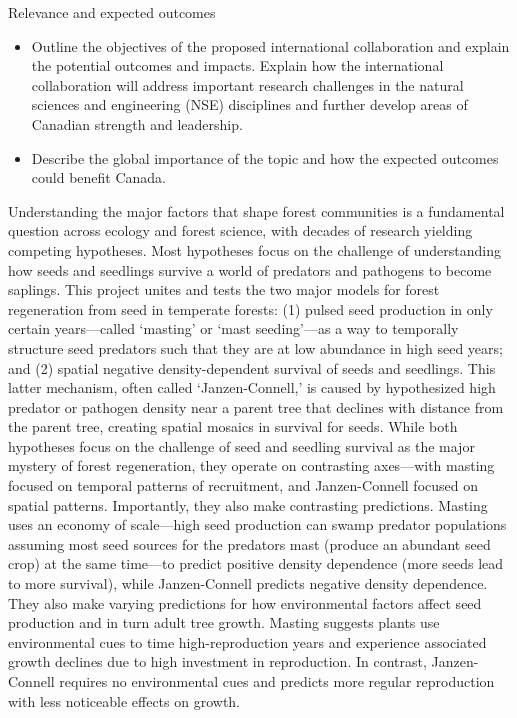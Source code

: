 \documentclass[12pt,oneside]{article}
\newenvironment{smitemize}{
\begin{itemize}
  \setlength{\itemsep}{1pt}
  \setlength{\parskip}{0pt}
  \setlength{\parsep}{0pt}}
{\end{itemize}
}
\begin{document}
{\sc Relevance and expected outcomes} 
\vspace{-1ex}
\begin{smitemize}
\item Outline the objectives of the proposed international collaboration and explain the potential outcomes and impacts. Explain how the international collaboration will address important research challenges in the natural sciences and engineering (NSE) disciplines and further develop areas of Canadian strength and leadership. 
\item Describe the global importance of the topic and how the expected outcomes could benefit Canada.
\end{smitemize}
Understanding the major factors that shape forest communities is a fundamental question across ecology and forest science, with decades of research yielding competing hypotheses. Most hypotheses focus on the challenge of understanding how seeds and seedlings survive a world of predators and pathogens to become saplings.\cite{janzen1971seed,connell1983prevalence,comita2014testing,davies2024seed} This project unites and tests the two major models for forest regeneration from seed in temperate forests: (1) pulsed seed production in only certain years---called `masting' or `mast seeding'---as a way to temporally structure seed predators such that they are at low abundance in high seed years;\cite{koenig2021brief,pearse2016mechanisms} and (2) spatial negative density-dependent survival of seeds and seedlings.\cite{connell1983prevalence,comita2014testing} This latter mechanism, often called `Janzen-Connell,' is caused by hypothesized high predator or pathogen density near a parent tree that declines with distance from the parent tree, creating spatial mosaics in survival for seeds.\cite{janzen1970herbivores,connell1983prevalence} While both hypotheses focus on the challenge of seed and seedling survival as the major mystery of forest regeneration, they operate on contrasting axes---with masting focused on temporal patterns of recruitment,\cite{pearse2017inter} and Janzen-Connell focused on spatial patterns. Importantly, they also make contrasting predictions. Masting uses an economy of scale---high seed production can swamp predator populations assuming most seed sources for the predators mast (produce an abundant seed crop) at the same time---to predict positive density dependence (more seeds lead to more survival), while Janzen-Connell predicts negative density dependence. They also make varying predictions for how environmental factors affect seed production and in turn adult tree growth. Masting suggests plants use environmental cues to time high-reproduction years and experience associated growth declines due to high investment in reproduction.\cite{koenig1998scale,hacket2016tree,pearse2016mechanisms,bogdziewicz2021climate} In contrast, Janzen-Connell requires no environmental cues and predicts more regular reproduction with less noticeable effects on growth. 
\end{document}
